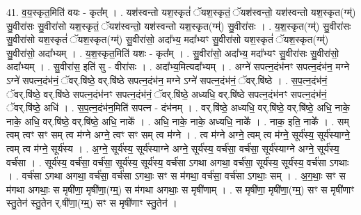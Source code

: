 \documentclass[17pt]{extarticle}
\begin{document}
41. व॒य॒स्कृत॒मिति॑ वयः - कृत᳚म् । . यश॑स्वन्तो यश॒स्कृतं॑ ॅयश॒स्कृतं॒ ॅयश॑स्वन्तो॒ यश॑स्वन्तो यश॒स्कृत(ग्म्॑) सु॒वीरा॑सः सु॒वीरा॑सो यश॒स्कृतं॒ ॅयश॑स्वन्तो॒ यश॑स्वन्तो यश॒स्कृत(ग्म्॑) सु॒वीरा॑सः । . य॒श॒स्कृत(ग्म्॑) सु॒वीरा॑सः सु॒वीरा॑सो यश॒स्कृतं॑ ॅयश॒स्कृत(ग्म्॑) सु॒वीरा॑सो॒ अदा᳚भ्य॒ मदा᳚भ्यꣳ सु॒वीरा॑सो यश॒स्कृतं॑ ॅयश॒स्कृत(ग्म्॑) सु॒वीरा॑सो॒ अदा᳚भ्यम् । . य॒श॒स्कृत॒मिति॑ यशः - कृत᳚म् । . सु॒वीरा॑सो॒ अदा᳚भ्य॒ मदा᳚भ्यꣳ सु॒वीरा॑सः सु॒वीरा॑सो॒ अदा᳚भ्यम् । . सु॒वीरा॑स॒ इति॑ सु - वीरा॑सः । . अदा᳚भ्य॒मित्यदा᳚भ्यम् । . अग्ने॑ सपत्न॒दंभ॑नꣳ सपत्न॒दंभ॑न॒ मग्ने ऽग्ने॑ सपत्न॒दंभ॑नं॒ ॅवर्.षि॑ष्ठे॒ वर्.षि॑ष्ठे सपत्न॒दंभ॑न॒ मग्ने ऽग्ने॑ सपत्न॒दंभ॑नं॒ ॅवर्.षि॑ष्ठे । . स॒प॒त्न॒दंभ॑नं॒ ॅवर्.षि॑ष्ठे॒ वर्.षि॑ष्ठे सपत्न॒दंभ॑नꣳ सपत्न॒दंभ॑नं॒ ॅवर्.षि॑ष्ठे॒ अध्यधि॒ वर्.षि॑ष्ठे सपत्न॒दंभ॑नꣳ सपत्न॒दंभ॑नं॒ ॅवर्.षि॑ष्ठे॒ अधि॑ । . स॒प॒त्न॒दंभ॑न॒मिति॑ सपत्न - दंभ॑नम् । . वर्.षि॑ष्ठे॒ अध्यधि॒ वर्.षि॑ष्ठे॒ वर्.षि॑ष्ठे॒ अधि॒ नाके॒ नाके॒ अधि॒ वर्.षि॑ष्ठे॒ वर्.षि॑ष्ठे॒ अधि॒ नाके᳚ । . अधि॒ नाके॒ नाके॒ अध्यधि॒ नाके᳚ । . नाक॒ इति॒ नाके᳚ । . सम् त्वम् त्वꣳ सꣳ सम् त्व म॑ग्ने अग्ने॒ त्वꣳ सꣳ सम् त्व म॑ग्ने । . त्व म॑ग्ने अग्ने॒ त्वम् त्व म॑ग्ने॒ सूर्य॑स्य॒ सूर्य॑स्याग्ने॒ त्वम् त्व म॑ग्ने॒ सूर्य॑स्य । . अ॒ग्ने॒ सूर्य॑स्य॒ सूर्य॑स्याग्ने अग्ने॒ सूर्य॑स्य॒ वर्च॑सा॒ वर्च॑सा॒ सूर्य॑स्याग्ने अग्ने॒ सूर्य॑स्य॒ वर्च॑सा । . सूर्य॑स्य॒ वर्च॑सा॒ वर्च॑सा॒ सूर्य॑स्य॒ सूर्य॑स्य॒ वर्च॑सा ऽगथा अगथा॒ वर्च॑सा॒ सूर्य॑स्य॒ सूर्य॑स्य॒ वर्च॑सा ऽगथाः । . वर्च॑सा ऽगथा अगथा॒ वर्च॑सा॒ वर्च॑सा ऽगथाः॒ सꣳ स म॑गथा॒ वर्च॑सा॒ वर्च॑सा ऽगथाः॒ सम् । . अ॒ग॒थाः॒ सꣳ स म॑गथा अगथाः॒ स मृषी॑णा॒ मृषी॑णा॒(ग्म्॒) स म॑गथा अगथाः॒ स मृषी॑णाम् । . स मृषी॑णा॒ मृषी॑णा॒(ग्म्॒) सꣳ स मृषी॑णाꣳ स्तु॒तेन॑ स्तु॒तेन र्.षी॑णा॒(ग्म्॒) सꣳ स मृषी॑णाꣳ स्तु॒तेन॑ । \newline
\end{document}
